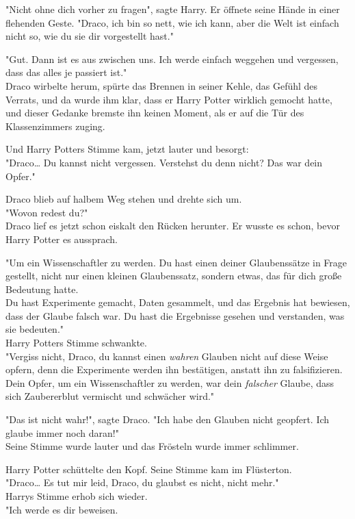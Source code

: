 {"Nicht ohne dich vorher zu fragen", sagte Harry. Er öffnete seine Hände in einer flehenden Geste. "Draco, ich bin so nett, wie ich kann, aber die Welt ist einfach nicht so, wie du sie dir vorgestellt hast."

"Gut. Dann ist es aus zwischen uns. Ich werde einfach weggehen und vergessen, dass das alles je passiert ist."\\ Draco wirbelte herum, spürte das Brennen in seiner Kehle, das Gefühl des Verrats, und da wurde ihm klar, dass er Harry Potter wirklich gemocht hatte, und dieser Gedanke bremste ihn keinen Moment, als er auf die Tür des Klassenzimmers zuging.

Und Harry Potters Stimme kam, jetzt lauter und besorgt:\\ "Draco… Du kannst nicht vergessen. Verstehst du denn nicht? Das war dein Opfer."

Draco blieb auf halbem Weg stehen und drehte sich um.\\ "Wovon redest du?"\\ Draco lief es jetzt schon eiskalt den Rücken herunter. Er wusste es schon, bevor Harry Potter es aussprach.

"Um ein Wissenschaftler zu werden. Du hast einen deiner Glaubenssätze in Frage gestellt, nicht nur einen kleinen Glaubenssatz, sondern etwas, das für dich große Bedeutung hatte.\\ Du hast Experimente gemacht, Daten gesammelt, und das Ergebnis hat bewiesen, dass der Glaube falsch war. Du hast die Ergebnisse gesehen und verstanden, was sie bedeuten."\\ Harry Potters Stimme schwankte.\\ "Vergiss nicht, Draco, du kannst einen \emph{wahren} Glauben nicht auf diese Weise opfern, denn die Experimente werden ihn bestätigen, anstatt ihn zu falsifizieren.\\ Dein Opfer, um ein Wissenschaftler zu werden, war dein \emph{falscher} Glaube, dass sich Zaubererblut vermischt und schwächer wird."

"Das ist nicht wahr!", sagte Draco. "Ich habe den Glauben nicht geopfert. Ich glaube immer noch daran!"\\ Seine Stimme wurde lauter und das Frösteln wurde immer schlimmer.

Harry Potter schüttelte den Kopf. Seine Stimme kam im Flüsterton.\\ "Draco… Es tut mir leid, Draco, du glaubst es nicht, nicht mehr."\\ Harrys Stimme erhob sich wieder.\\ "Ich werde es dir beweisen.

}
